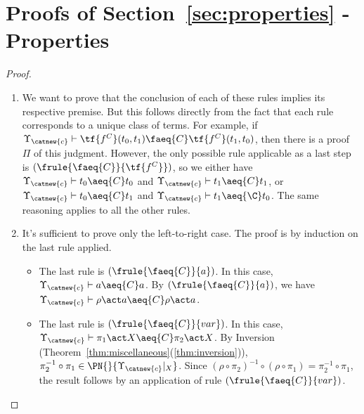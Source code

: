 \section{Proofs of Section~\ref{sec:properties} - Properties}\label{app:properties}

\miscellaneous*

\begin{proof}
\begin{enumerate}
    \item We want to prove that the conclusion of each of these rules implies its respective premise. But this follows directly from the fact that each rule corresponds to a unique class of terms. For example, if $\Upsilon_{\catnew{c}} \vdash  \tf{f^C}(t_0,t_1) \faeq{C} \tf{f^C}(t_1,t_0)$, then there is a proof $\Pi$ of this judgment. However, the only possible rule applicable as a last step is $(\frule{\faeq{C}}{\tf{f^C}})$, so we either have $\Upsilon_{\catnew{c}}\vdash t_0 \aeq{C} t_0$ and $\Upsilon_{\catnew{c}} \vdash t_1 \aeq{C} t_1$, or $\Upsilon_{\catnew{c}} \vdash t_0 \aeq{C} t_1$ and $\Upsilon_{\catnew{c}} \vdash  t_1 \aeq{\C} t_0$. The same reasoning applies to all the other rules.

    \item It's sufficient to prove only the left-to-right case. The proof is by induction on the last rule applied.
        \begin{itemize}
            \item The last rule is $(\frule{\faeq{C}}{a})$. In this case, $\Upsilon_{\catnew{c}} \vdash  a \aeq{C}a$. By $(\frule{\faeq{C}}{a})$, we have $\Upsilon_{\catnew{c}} \vdash  \rho\act a \aeq{C}\rho\act a$.

            \item The last rule is $(\frule{\faeq{C}}{var})$. In this case, $\Upsilon_{\catnew{c}} \vdash \pi_1\act X \aeq{C} \pi_2\act X$. By Inversion (Theorem~\ref{thm:miscellaneous}(\ref{thm:inversion})), $\pi_2^{-1}\circ\pi_1\in \PN{}{\Upsilon_{\catnew{c}}|_X}$. Since $(\rho\circ\pi_2)^{-1}\circ(\rho\circ\pi_1) = \pi_2^{-1}\circ\pi_1$, the result follows by an application of rule $(\frule{\faeq{C}}{var})$.


\end{itemize}
\end{enumerate}
\end{proof}
